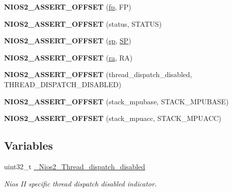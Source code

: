 \begin{DoxyCompactItemize}
\mbox{\label{nios2-thread-dispatch-disabled_8c_a86818454746f2a59dc9cc9677d29cf9b}} 
{\bfseries N\+I\+O\+S2\+\_\+\+A\+S\+S\+E\+R\+T\+\_\+\+O\+F\+F\+S\+ET} (\mbox{\hyperlink{group__mips__regs_gae771351dd440a8640270282362e338d0}{fp}}, FP)
\item 
\mbox{\label{nios2-thread-dispatch-disabled_8c_afa5f8d743c09fe0fe7fe6b249fc40cb1}} 
{\bfseries N\+I\+O\+S2\+\_\+\+A\+S\+S\+E\+R\+T\+\_\+\+O\+F\+F\+S\+ET} (status, S\+T\+A\+T\+US)
\item 
\mbox{\label{nios2-thread-dispatch-disabled_8c_a871eb117d098bd837037c787159d3bc6}} 
{\bfseries N\+I\+O\+S2\+\_\+\+A\+S\+S\+E\+R\+T\+\_\+\+O\+F\+F\+S\+ET} (\mbox{\hyperlink{group__mips__regs_ga8d40798874dab99986478ef00ff3e297}{sp}}, \mbox{\hyperlink{group__i386__uart_gaecd69d9a67487cc45c38eb184c50538a}{SP}})
\item 
\mbox{\label{nios2-thread-dispatch-disabled_8c_abfa3146f9333e60236e32725de047659}} 
{\bfseries N\+I\+O\+S2\+\_\+\+A\+S\+S\+E\+R\+T\+\_\+\+O\+F\+F\+S\+ET} (\mbox{\hyperlink{group__mips__regs_ga6c3a7669c6bdfd66528633d977cdb6b8}{ra}}, RA)
\item 
\mbox{\label{nios2-thread-dispatch-disabled_8c_a21bb189dc5e986b47e3b7af816accafb}} 
{\bfseries N\+I\+O\+S2\+\_\+\+A\+S\+S\+E\+R\+T\+\_\+\+O\+F\+F\+S\+ET} (thread\+\_\+dispatch\+\_\+disabled, T\+H\+R\+E\+A\+D\+\_\+\+D\+I\+S\+P\+A\+T\+C\+H\+\_\+\+D\+I\+S\+A\+B\+L\+ED)
\item 
\mbox{\label{nios2-thread-dispatch-disabled_8c_aabedacf05feeb8e0d826dc49ebc14eb7}} 
{\bfseries N\+I\+O\+S2\+\_\+\+A\+S\+S\+E\+R\+T\+\_\+\+O\+F\+F\+S\+ET} (stack\+\_\+mpubase, S\+T\+A\+C\+K\+\_\+\+M\+P\+U\+B\+A\+SE)
\item 
\mbox{\label{nios2-thread-dispatch-disabled_8c_ae91187a8fe9504ccf6b6fc633edec519}} 
{\bfseries N\+I\+O\+S2\+\_\+\+A\+S\+S\+E\+R\+T\+\_\+\+O\+F\+F\+S\+ET} (stack\+\_\+mpuacc, S\+T\+A\+C\+K\+\_\+\+M\+P\+U\+A\+CC)
\end{DoxyCompactItemize}
\subsection*{Variables}
\begin{DoxyCompactItemize}
\item 
uint32\+\_\+t \mbox{\hyperlink{nios2-thread-dispatch-disabled_8c_af065794b1f232ce93bb2caee956c4e69}{\+\_\+\+Nios2\+\_\+\+Thread\+\_\+dispatch\+\_\+disabled}}
\begin{DoxyCompactList}\small\item\em Nios II specific thread dispatch disabled indicator. \end{DoxyCompactList}\end{DoxyCompactItemize}


